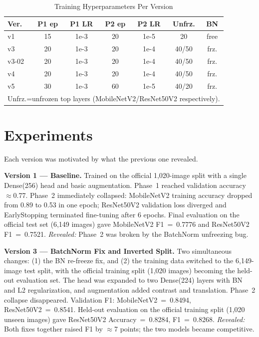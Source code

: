 \documentclass[conference]{IEEEtran}
\begin{document}
\begin{table}[htbp]
  \caption{Training Hyperparameters Per Version}
  \begin{center}
  \begin{tabular}{l c c c c c c}
    \toprule
    \textbf{Ver.} & \textbf{P1 ep} & \textbf{P1 LR} &
      \textbf{P2 ep} & \textbf{P2 LR} & \textbf{Unfrz.} & \textbf{BN} \\
    \midrule
    v1    & 15 & 1e-3 & 20 & 1e-5 & 20    & free \\
    v3    & 20 & 1e-3 & 20 & 1e-4 & 40/50 & frz. \\
    v3-02 & 20 & 1e-3 & 20 & 1e-4 & 40/50 & frz. \\
    v4    & 20 & 1e-3 & 20 & 1e-4 & 40/50 & frz. \\
    v5    & 30 & 1e-3 & 60 & 1e-5 & 40/20 & frz. \\
    \bottomrule
    \multicolumn{7}{l}{\footnotesize Unfrz.=unfrozen top layers
      (MobileNetV2/ResNet50V2 respectively).}\\
  \end{tabular}
  \label{tab:hparams}
  \end{center}
\end{table}

\section{Experiments}
\label{sec:exp}

Each version was motivated by what the previous one revealed.

\textbf{Version 1 — Baseline.}
Trained on the official 1,020-image split with a single Dense(256)
head and basic augmentation. Phase~1 reached validation accuracy
$\approx$0.77. Phase~2 immediately collapsed: MobileNetV2 training
accuracy dropped from 0.89 to 0.53 in one epoch; ResNet50V2 validation
loss diverged and EarlyStopping terminated fine-tuning after 6 epochs.
Final evaluation on the official test set (6,149 images) gave
MobileNetV2 F1~=~0.7776 and ResNet50V2 F1~=~0.7521.
\textit{Revealed:} Phase~2 was broken by the BatchNorm unfreezing bug.

\textbf{Version 3 — BatchNorm Fix and Inverted Split.}
Two simultaneous changes: (1) the BN re-freeze fix, and (2) the
training data switched to the 6,149-image test split, with the
official training split (1,020 images) becoming the held-out
evaluation set. The head was expanded to two Dense(224) layers with
BN and L2 regularization, and augmentation added contrast and
translation. Phase~2 collapse disappeared. Validation F1:
MobileNetV2~=~0.8494, ResNet50V2~=~0.8541. Held-out evaluation on
the official training split (1,020 unseen images) gave ResNet50V2
Accuracy~=~0.8284, F1~=~0.8268.
\textit{Revealed:} Both fixes together raised F1 by $\approx$7 points;
the two models became competitive.
\end{document}
